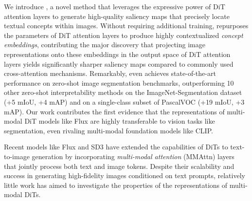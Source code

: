 We introduce \tool{}, a novel method that leverages the expressive power of DiT attention layers to generate high-quality saliency maps that precisely locate textual concepts within images. Without requiring additional training, \tool{} repurposes the parameters of DiT attention layers to produce highly contextualized \textit{concept embeddings}, contributing the major discovery that projecting image representations onto these embeddings in the output space of DiT attention layers yields significantly sharper saliency maps compared to commonly used cross-attention mechanisms.  Remarkably, \tool{} even achieves state-of-the-art performance on zero-shot image segmentation benchmarks, outperforming 10 other zero-shot interpretability methods on the ImageNet-Segmentation dataset (+5 mIoU, +4 mAP) and on a single-class subset of PascalVOC (+19 mIoU, +3 mAP). Our work contributes the first evidence that the representations of multi-modal DiT models like Flux are highly transferable to vision tasks like segmentation, even rivaling multi-modal foundation models like CLIP.





Recent models like Flux \cite{noauthor_black-forest-labsflux_nodate} and SD3 \cite{} have extended the capabilities of DiTs to text-to-image generation by incorporating \textit{multi-modal attention} (MMAttn) layers that jointly process both text and image tokens. Despite their scalability and success in generating high-fidelity images conditioned on text prompts, relatively little work has aimed to investigate the properties of the representations of multi-modal DiTs. 


